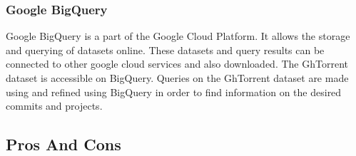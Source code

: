 \documentclass{article}
\begin{document}
\subsubsection*{Google BigQuery}
Google BigQuery is a part of the Google Cloud Platform. It allows the storage and querying of datasets online. These datasets and query results can be connected to other google cloud services and also downloaded. The GhTorrent dataset is accessible on BigQuery. Queries on the GhTorrent dataset are made  using and refined using BigQuery in order to find information on the desired commits and projects.


\subsection{Pros And Cons}
\end{document}
